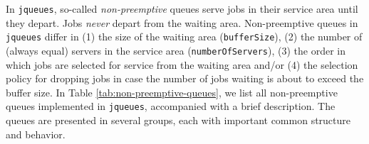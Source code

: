 In \lstinline|jqueues|,
  so-called {\em non-preemptive\/}
  queues
  serve jobs in their service area
  until they depart.
Jobs {\em never\/} depart from the waiting area.
Non-preemptive queues in \lstinline|jqueues|
  differ in
  (1) the size of the waiting area (\lstinline|bufferSize|),
  (2) the number of (always equal) servers in the service area
      (\lstinline|numberOfServers|),
  (3) the order in which jobs are selected
      for service from the waiting area
  and/or
  (4) the selection policy for dropping jobs
      in case the number of jobs waiting
      is about to exceed the buffer size.
In Table \ref{tab:non-preemptive-queues},
  we list all non-preemptive queues implemented in
  \lstinline|jqueues|, accompanied with a brief
  description.
The queues are presented in several groups,
  each with important common structure and behavior.
  
